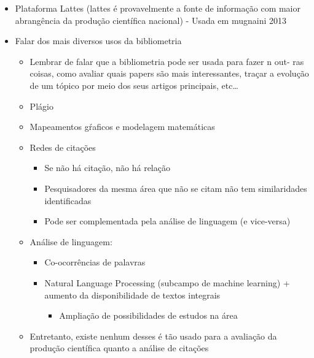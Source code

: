 \documentclass[11pt]{article}
\begin{document}
\begin{itemize}
\item Plataforma Lattes (lattes é provavelmente a fonte de informação com maior abrangência da produção científica nacional) - Usada em mugnaini 2013

\item Falar dos mais diversos usos da bibliometria
\begin{itemize}
\item Lembrar de falar que a bibliometria pode ser usada para fazer n out- ras coisas, como avaliar quais papers são mais interessantes, traçar a evolução de um tópico por meio dos seus artigos principais, etc\ldots{}
\item Plágio
\item Mapeamentos gŕaficos e modelagem matemáticas
\item Redes de citações
\begin{itemize}
\item Se não há citação, não há relação
\item Pesquisadores da mesma área que não se citam não tem similaridades identificadas
\item Pode ser complementada pela análise de linguagem (e vice-versa)
\end{itemize}
\item Análise de linguagem:
\begin{itemize}
\item Co-ocorrências de palavras
\item Natural Language Processing (subcampo de machine learning) + aumento da disponibilidade de textos integrais
\begin{itemize}
\item Ampliação de possibilidades de estudos na área
\end{itemize}
\end{itemize}
\item Entretanto, existe nenhum desses é tão usado para a avaliação da produção científica quanto a análise de citações
\end{itemize}
\end{itemize}
\end{document}
